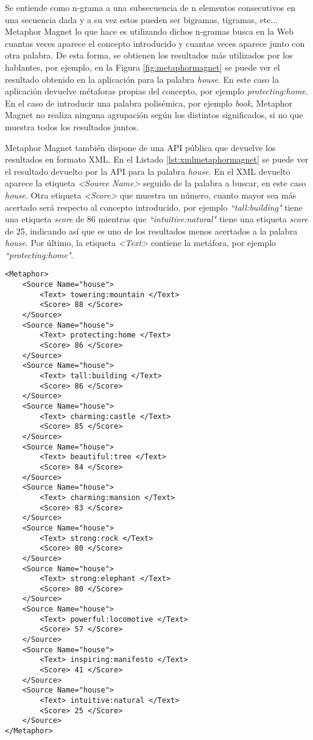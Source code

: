 Se entiende como n-grama \citep{ngrama1999} a una subsecuencia de n elementos consecutivos en una secuencia dada y a su vez estos pueden ser bigramas, tigramas, etc... Metaphor Magnet lo que hace es utilizando dichos n-gramas busca en la Web cuantas veces aparece el concepto introducido y cuantas veces aparece junto con otra palabra. De esta forma, se obtienen los resultados más utilizados por los hablantes, por ejemplo, en la Figura \ref{fig:metaphormagnet} se puede ver el resultado obtenido en la aplicación para la palabra \textit{house}. En este caso la aplicación devuelve métaforas propias del concepto, por ejemplo \textit{protecting:home}.
En el caso de introducir una palabra polisémica, por ejemplo \textit{book}, Metaphor Magnet no realiza ninguna agrupación según los distintos significados, si no que muestra todos los resultados juntos.

Metaphor Magnet también dispone de una API pública que devuelve los resultados en formato XML. En el Listado \ref{lst:xmlmetaphormagnet} se puede ver el resultado devuelto por la API para la palabra \textit{house}. En el XML devuelto aparece la etiqueta \textit{<Source Name>} seguido de la palabra a buscar, en este caso \textit{house}. Otra etiqueta \textit{<Score>} que muestra un número, cuanto mayor sea más acertado será respecto al concepto introducido, por ejemplo \textit{``tall:building"}  tiene una etiqueta \textit{score} de 86 mientras que \textit{``intuitive:natural"} tiene una etiqueta \textit{score} de 25, indicando así que es uno de los resultados menos acertados a la palabra \textit{house}. Por último, la etiqueta \textit{<Text>} contiene la metáfora, por ejemplo \textit{``protecting:home"}.



\lstset{language=XML}
\begin{lstlisting}[caption= XML devuelto por Metaphor Magnet para la palabra \textit{house}, label={lst:xmlmetaphormagnet}, frame=single]
<Metaphor>
	<Source Name="house">
		<Text> towering:mountain </Text>
		<Score> 88 </Score>
	</Source>
	<Source Name="house">
		<Text> protecting:home </Text>
		<Score> 86 </Score>
	</Source>
	<Source Name="house">
		<Text> tall:building </Text>
		<Score> 86 </Score>
	</Source>
	<Source Name="house">
		<Text> charming:castle </Text>
		<Score> 85 </Score>
	</Source>
	<Source Name="house">
		<Text> beautiful:tree </Text>
		<Score> 84 </Score>
	</Source>
	<Source Name="house">
		<Text> charming:mansion </Text>
		<Score> 83 </Score>
	</Source>
	<Source Name="house">
		<Text> strong:rock </Text>
		<Score> 80 </Score>
	</Source>
	<Source Name="house">
		<Text> strong:elephant </Text>
		<Score> 80 </Score>
	</Source>
	<Source Name="house">
		<Text> powerful:locomotive </Text>
		<Score> 57 </Score>
	</Source>
	<Source Name="house">
		<Text> inspiring:manifesto </Text>
		<Score> 41 </Score>
	</Source>
	<Source Name="house">
		<Text> intuitive:natural </Text>
		<Score> 25 </Score>
	</Source>
</Metaphor>
\end{lstlisting}




